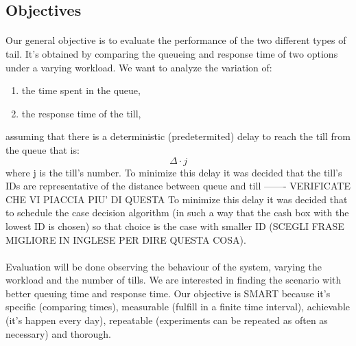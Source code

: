 \subsection{Objectives}
\paragraph{}
Our general objective is to evaluate the performance of the two different types of tail. It’s obtained by comparing the queueing and response time of two options under a varying workload. We want to analyze the variation of:
\begin{enumerate}
	\item the time spent in the queue, 
	\item the response time of the till,
\end{enumerate}
assuming that there is a deterministic (predetermited) delay to reach the till from the queue that is: \[\Delta \cdot j\] 
where j is the till’s number. To minimize this delay it was decided that the till's IDs are representative of the distance between queue and till ------- VERIFICATE CHE VI PIACCIA PIU' DI QUESTA To minimize this delay it was decided that to schedule the case decision algorithm (in such a way that the cash box with the lowest ID is chosen) so that choice is the case with smaller ID (SCEGLI FRASE MIGLIORE IN INGLESE PER DIRE QUESTA COSA). 
\paragraph{} Evaluation will be done observing the behaviour of the system, varying the workload and the number of tills. We are interested in finding the scenario with better queuing time and response time. 
Our objective is SMART because it’s specific (comparing times), measurable (fulfill in a finite time interval), achievable (it’s happen every day), repeatable (experiments can be repeated as often as necessary) and thorough. 





